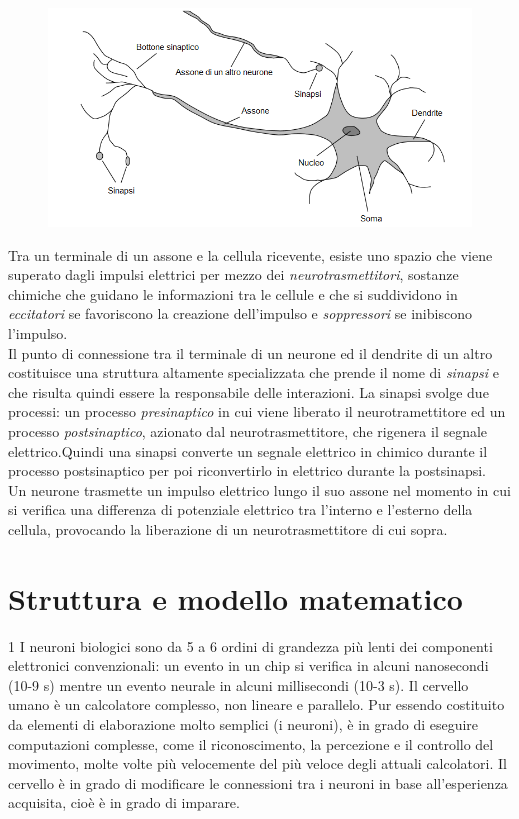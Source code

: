 \documentclass[12pt,a4paper,oneside]{book}
\begin{document}
		 \begin{figure}[h]
		 	\centering
		 	\includegraphics[width=1\linewidth]{IMMAGINI/neuron}
		 	\caption{}
		 	\label{fig:neuron}
		 \end{figure}
	 
	 	Tra un terminale di un assone e la cellula ricevente, esiste uno spazio che viene superato dagli impulsi elettrici per mezzo dei \emph{neurotrasmettitori}, sostanze chimiche che guidano le informazioni tra le cellule e che si suddividono in \emph{eccitatori} se favoriscono la creazione dell'impulso e \emph{soppressori} se inibiscono l'impulso.\\ Il punto di connessione tra il terminale di un neurone ed il dendrite di un altro costituisce una struttura altamente specializzata che prende il nome di \emph{sinapsi} e che risulta quindi essere la responsabile delle interazioni. La sinapsi svolge due processi: un processo \emph{presinaptico} in cui viene liberato il neurotramettitore ed un processo \emph{postsinaptico}, azionato dal neurotrasmettitore, che rigenera il segnale elettrico.Quindi una sinapsi converte un segnale elettrico in chimico durante il processo postsinaptico per poi riconvertirlo in elettrico durante la postsinapsi.\\ 
	 	Un neurone trasmette un impulso elettrico lungo il suo assone nel momento in cui si verifica una differenza di potenziale elettrico tra l’interno e l’esterno della cellula, provocando la liberazione di un neurotrasmettitore di cui sopra.
		 
		
		
		
		
		
		
		
		\section{Struttura e modello matematico}
		1 I neuroni biologici sono da 5 a 6 ordini di grandezza più lenti dei componenti elettronici convenzionali: un evento in un chip si verifica in alcuni nanosecondi (10-9 s) mentre un evento neurale in alcuni millisecondi (10-3 s). Il cervello umano è un calcolatore complesso, non lineare e parallelo. Pur essendo costituito da elementi di elaborazione molto semplici (i neuroni), è in grado di eseguire computazioni complesse, come il riconoscimento, la percezione e il controllo del movimento, molte volte più velocemente del più veloce degli attuali calcolatori. Il cervello è in grado di modificare le connessioni tra i neuroni in base all’esperienza acquisita, cioè è in grado di imparare. 
		
\end{document}
